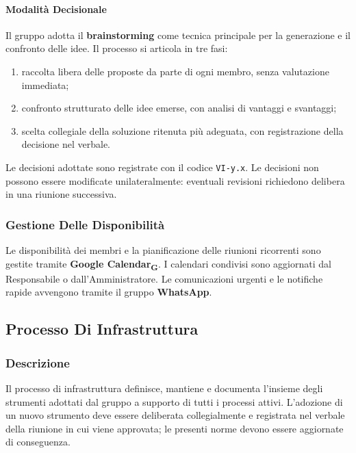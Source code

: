 \paragraph{Modalità Decisionale}
Il gruppo adotta il \textbf{brainstorming} come tecnica principale per la generazione
e il confronto delle idee. Il processo si articola in tre fasi:
 
\begin{enumerate}
  \item raccolta libera delle proposte da parte di ogni membro, senza valutazione
        immediata;
  \item confronto strutturato delle idee emerse, con analisi di vantaggi e
        svantaggi;
  \item scelta collegiale della soluzione ritenuta più adeguata, con registrazione
        della decisione nel verbale.
\end{enumerate}
 
Le decisioni adottate sono registrate con il codice \texttt{VI-y.x}. Le decisioni
non possono essere modificate unilateralmente: eventuali revisioni richiedono
delibera in una riunione successiva.
 
\subsubsection{Gestione Delle Disponibilità}
 
Le disponibilità dei membri e la pianificazione delle riunioni ricorrenti sono
gestite tramite \textbf{Google Calendar\textsubscript{G}}. I calendari condivisi
sono aggiornati dal Responsabile o dall'Amministratore. Le comunicazioni urgenti
e le notifiche rapide avvengono tramite il gruppo \textbf{WhatsApp}.
 
\subsection{Processo Di Infrastruttura}
\label{sec:infrastruttura}
 
\subsubsection{Descrizione}
 
Il processo di infrastruttura definisce, mantiene e documenta l'insieme degli
strumenti adottati dal gruppo a supporto di tutti i processi attivi. L'adozione
di un nuovo strumento deve essere deliberata collegialmente e registrata nel verbale
della riunione in cui viene approvata; le presenti norme devono essere aggiornate
di conseguenza.
 
